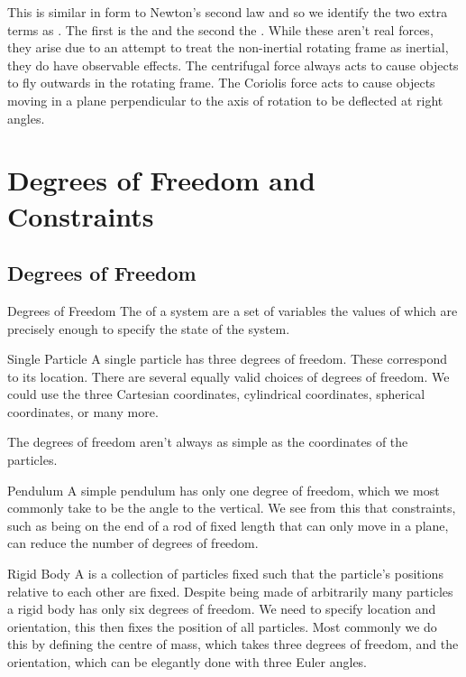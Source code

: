 \documentclass[fleqn]{NotesClass}
\begin{document}
    This is similar in form to Newton's second law and so we identify the two extra terms as .
    The first is the  and the second the .
    While these aren't real forces, they arise due to an attempt to treat the non-inertial rotating frame as inertial, they do have observable effects.
    The centrifugal force always acts to cause objects to fly outwards in the rotating frame.
    The Coriolis force acts to cause objects moving in a plane perpendicular to the axis of rotation to be deflected at right angles.
    
    \chapter{Degrees of Freedom and Constraints}
    \section{Degrees of Freedom}
    \begin{dfn}{Degrees of Freedom}{}
        The  of a system are a set of variables the values of which are precisely enough to specify the state of the system.
    \end{dfn}
    
    \begin{exm}{Single Particle}{}
        A single particle has three degrees of freedom.
        These correspond to its location.
        There are several equally valid choices of degrees of freedom.
        We could use the three Cartesian coordinates, cylindrical coordinates, spherical coordinates, or many more.
    \end{exm}
    
    The degrees of freedom aren't always as simple as the coordinates of the particles.
    
    \begin{exm}{Pendulum}{}
        A simple pendulum has only one degree of freedom, which we most commonly take to be the angle to the vertical.
        We see from this that constraints, such as being on the end of a rod of fixed length that can only move in a plane, can reduce the number of degrees of freedom.
    \end{exm}
    
    \begin{exm}{Rigid Body}{}
        A  is a collection of particles fixed such that the particle's positions relative to each other are fixed.
        Despite being made of arbitrarily many particles a rigid body has only six degrees of freedom.
        We need to specify location and orientation, this then fixes the position of all particles.
        Most commonly we do this by defining the centre of mass, which takes three degrees of freedom, and the orientation, which can be elegantly done with three Euler angles.
    \end{exm}
    
\end{document}
